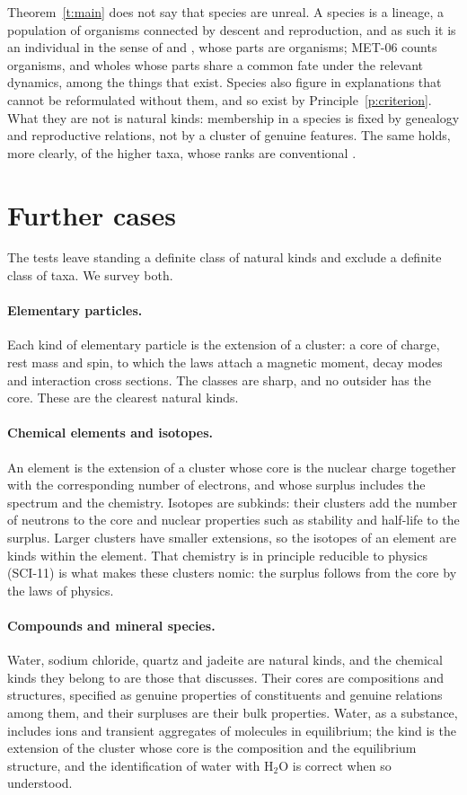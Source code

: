 \documentclass{situationist-preprint}
\begin{document}
Theorem~\ref{t:main} does not say that species are unreal. A species is a lineage, a population of organisms connected by descent and reproduction, and as such it is an individual in the sense of \citet{Ghiselin1974} and \citet{Hull1978}, whose parts are organisms; MET-06 counts organisms, and wholes whose parts share a common fate under the relevant dynamics, among the things that exist. Species also figure in explanations that cannot be reformulated without them, and so exist by Principle~\ref{p:criterion}. What they are not is natural kinds: membership in a species is fixed by genealogy and reproductive relations, not by a cluster of genuine features. The same holds, more clearly, of the higher taxa, whose ranks are conventional \citep{Ereshefsky2001}.

\section{Further cases}\label{s:cases}

The tests leave standing a definite class of natural kinds and exclude a definite class of taxa. We survey both.

\paragraph{Elementary particles.} Each kind of elementary particle is the extension of a cluster: a core of charge, rest mass and spin, to which the laws attach a magnetic moment, decay modes and interaction cross sections. The classes are sharp, and no outsider has the core. These are the clearest natural kinds.

\paragraph{Chemical elements and isotopes.} An element is the extension of a cluster whose core is the nuclear charge together with the corresponding number of electrons, and whose surplus includes the spectrum and the chemistry. Isotopes are subkinds: their clusters add the number of neutrons to the core and nuclear properties such as stability and half-life to the surplus. Larger clusters have smaller extensions, so the isotopes of an element are kinds within the element. That chemistry is in principle reducible to physics (SCI-11) is what makes these clusters nomic: the surplus follows from the core by the laws of physics.

\paragraph{Compounds and mineral species.} Water, sodium chloride, quartz and jadeite are natural kinds, and the chemical kinds they belong to are those that \citet{Hendry2006} discusses. Their cores are compositions and structures, specified as genuine properties of constituents and genuine relations among them, and their surpluses are their bulk properties. Water, as a substance, includes ions and transient aggregates of molecules in equilibrium; the kind is the extension of the cluster whose core is the composition and the equilibrium structure, and the identification of water with H$_2$O is correct when so understood.
\end{document}
